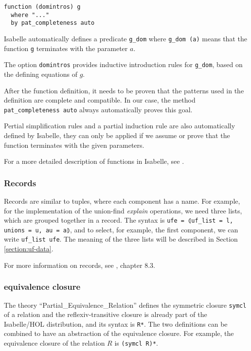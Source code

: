 \begin{lstlisting}
function (domintros) g
  where "..."
  by pat_completeness auto
\end{lstlisting}

Isabelle automatically defines a predicate \lstinline|g_dom| where \lstinline{g_dom (a)} means that the function \lstinline|g| terminates with the parameter $a$.

The option \lstinline{domintros} provides inductive introduction rules for \lstinline|g_dom|, based on the defining equations of $g$.

After the function definition, it needs to be proven that the patterns used in the definition are complete and compatible. In our case, the method \lstinline|pat_completeness auto| always automatically proves this goal.

Pertial simplification rules and a partial induction rule are also automatically defined by Isabelle, they can only be applied if we assume or prove that the function terminates with the given parameters.

For a more detailed description of functions in Isabelle, see \cite{functions}.

\subsubsection{Records}

Records are similar to tuples, where each component has a name. For example, for the implementation of the union-find \emph{explain} operations, we need three lists, which are grouped together in a record. The syntax is \lstinline{ufe = ⦇uf_list = l, unions = u, au = a⦈}, and to select, for example, the first component, we can write \lstinline{uf_list ufe}. The meaning of the three lists will be described in Section \ref{section:uf-data}.

For more information on records, see \cite{isabelle}, chapter 8.3.

\subsubsection{equivalence closure}

The theory ``Partial\_Equivalence\_Relation''\cite{Collections-AFP} defines the symmetric closure \lstinline{symcl} of a relation and the reflexiv-transitive closure is already part of the Isabelle/HOL distribution, and its syntax is \lstinline{R*}. The two definitions can be combined to have an abstraction of the equivalence closure. For example, the equivalence closure of the relation $R$ is \lstinline{(symcl R)*}.

